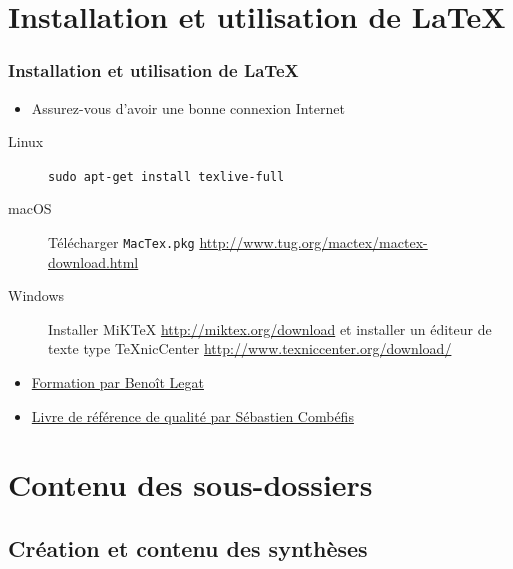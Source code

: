 \documentclass{beamer}
\begin{document}
\section{Installation et utilisation de \LaTeX}

\begin{frame}[fragile]
    \frametitle{Installation et utilisation de \LaTeX}
    \begin{itemize}
        \item Assurez-vous d'avoir une bonne connexion Internet
    \end{itemize}
    \begin{description}
        \item[Linux] \lstinline|sudo apt-get install texlive-full|
        \item[macOS] Télécharger \lstinline|MacTex.pkg|
            \url{http://www.tug.org/mactex/mactex-download.html}
        \item[Windows] Installer MiKTeX \url{http://miktex.org/download}
            et installer un éditeur de texte type TeXnicCenter
            \url{http://www.texniccenter.org/download/}
    \end{description}
    \begin{itemize}
        \item
            \href{https://github.com/blegat/LaTeXconf/blob/master/main.pdf}{Formation
            par Benoît Legat}
        \item
            \href{http://www.latex-howto.be/files/LaTeX-HowTo-full.pdf}{Livre
            de référence de qualité par Sébastien Combéfis}
    \end{itemize}
\end{frame}

\section{Contenu des sous-dossiers}

\subsection{Création et contenu des synthèses}
\end{document}
